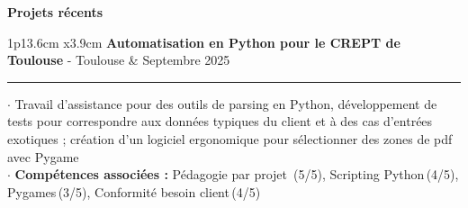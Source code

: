 \documentclass[10pt,a4paper]{article}
\newcommand{\score}[1]{\,(#1/5)}
\newcommand{\cvsection}[1]{\begin{center}\large\textcolor{sectcol}{\textbf{#1}}\end{center}}
\newcommand{\cvevent}[5]{%
\begin{tabular*}{1\textwidth}{p{13.6cm}  x{3.9cm}}
	\textbf{#2} - \textcolor{bgcol}{#3} &   \vspace{2.5pt}\textcolor{sectcol}{#1}
\end{tabular*}
\vspace{-8pt}
\textcolor{softcol}{\hrule}
\vspace{6pt}
  $\cdot$ #4\\[3pt]
  $\cdot$ #5\\[6pt]
}
\begin{document}
\cvsection{Projets récents}
\cvevent{Septembre 2025}{Automatisation en Python pour le CREPT de Toulouse}{Toulouse}
{Travail d'assistance pour des outils de parsing en Python, développement de tests pour correspondre aux données typiques du client et à des cas d'entrées exotiques ; création d'un logiciel ergonomique pour sélectionner des zones de pdf avec Pygame}
{\textbf{Compétences associées :} Pédagogie par projet \score{5}, Scripting Python\score{4}, Pygames\score{3}, Conformité besoin client\score{4}}



\null
\vspace*{\fill}
\end{document}
